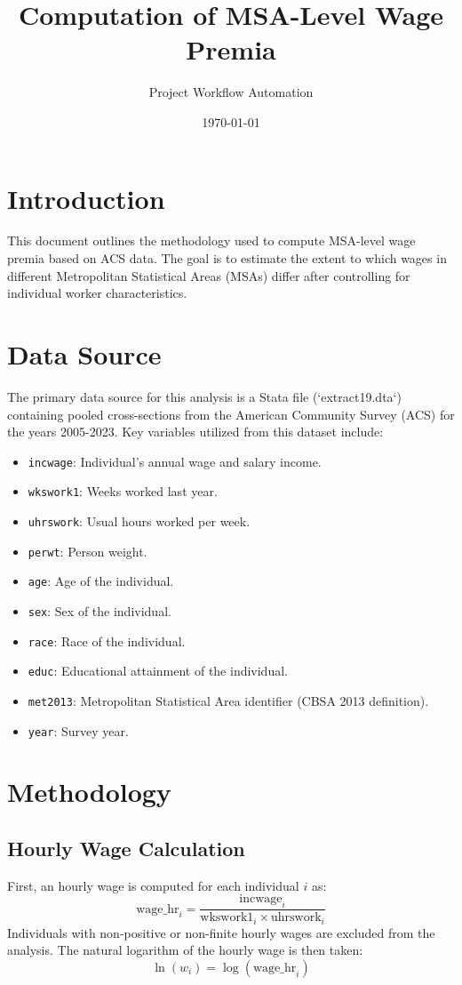 \documentclass{article}
\title{Computation of MSA-Level Wage Premia}
\author{Project Workflow Automation}
\date{\today}
\begin{document}
\maketitle

\section{Introduction}
This document outlines the methodology used to compute MSA-level wage premia based on ACS data. The goal is to estimate the extent to which wages in different Metropolitan Statistical Areas (MSAs) differ after controlling for individual worker characteristics.

\section{Data Source}
The primary data source for this analysis is a Stata file (`extract19.dta`) containing pooled cross-sections from the American Community Survey (ACS) for the years 2005-2023. Key variables utilized from this dataset include:
\begin{itemize}
    \item \texttt{incwage}: Individual's annual wage and salary income.
    \item \texttt{wkswork1}: Weeks worked last year.
    \item \texttt{uhrswork}: Usual hours worked per week.
    \item \texttt{perwt}: Person weight.
    \item \texttt{age}: Age of the individual.
    \item \texttt{sex}: Sex of the individual.
    \item \texttt{race}: Race of the individual.
    \item \texttt{educ}: Educational attainment of the individual.
    \item \texttt{met2013}: Metropolitan Statistical Area identifier (CBSA 2013 definition).
    \item \texttt{year}: Survey year.
\end{itemize}

\section{Methodology}

\subsection{Hourly Wage Calculation}
First, an hourly wage is computed for each individual $i$ as:
\begin{equation}
    \text{wage\_hr}_i = \frac{\text{incwage}_i}{\text{wkswork1}_i \times \text{uhrswork}_i}
\end{equation}
Individuals with non-positive or non-finite hourly wages are excluded from the analysis. The natural logarithm of the hourly wage is then taken:
\begin{equation}
    \ln(w_i) = \log(\text{wage\_hr}_i)
\end{equation}
\end{document}
